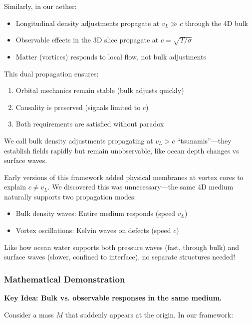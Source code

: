 Similarly, in our aether:
\begin{itemize}
\item Longitudinal density adjustments propagate at $v_L \gg c$ through the 4D bulk
\item Observable effects in the 3D slice propagate at $c = \sqrt{T / \sigma}$
\item Matter (vortices) responds to local flow, not bulk adjustments
\end{itemize}

This dual propagation ensures:
\begin{enumerate}
\item Orbital mechanics remain stable (bulk adjusts quickly)
\item Causality is preserved (signals limited to $c$)
\item Both requirements are satisfied without paradox
\end{enumerate}

We call bulk density adjustments propagating at $v_L > c$ ``tsunamis''---they establish fields rapidly but remain unobservable, like ocean depth changes vs surface waves.

\begin{tcolorbox}[title=Why Two Speeds Without Membranes]
Early versions of this framework added physical membranes at vortex cores
to explain $c \neq v_L$. We discovered this was unnecessary---the same 4D medium
naturally supports two propagation modes:

\begin{itemize}
\item Bulk density waves: Entire medium responds (speed $v_L$)
\item Vortex oscillations: Kelvin waves on defects (speed $c$)
\end{itemize}

Like how ocean water supports both pressure waves (fast, through bulk)
and surface waves (slower, confined to interface), no separate structures
needed!
\end{tcolorbox}

\subsubsection{Mathematical Demonstration}

\textbf{Key Idea: Bulk vs. observable responses in the same medium.}

Consider a mass $M$ that suddenly appears at the origin. In our framework:

